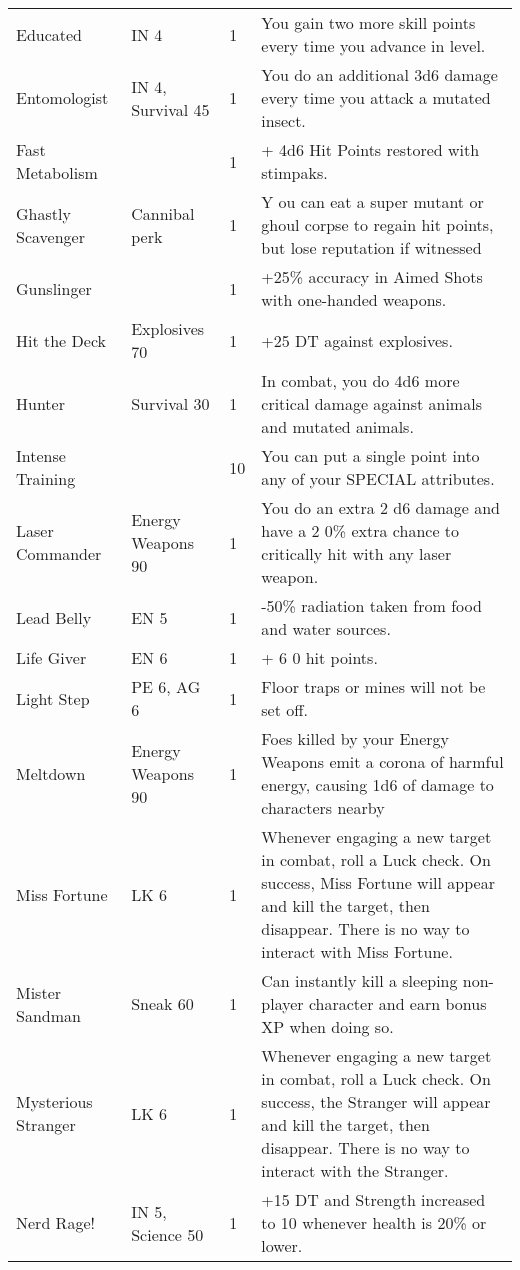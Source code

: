 \begin{longtable}{|p{3.3cm}|p{3.1cm}|p{1.2cm}|p{8.4cm}|}
Educated  & IN 4  & 1  & You gain two more skill points every time you advance in level.  \\
Entomologist  & IN 4, Survival 45  & 1  & You do an additional  3d6  damage every time you attack a mutated insect.  \\
Fast Metabolism  &  & 1  & + 4d6  Hit Points restored with stimpaks.  \\
Ghastly Scavenger  & Cannibal perk  & 1  & Y ou  can  eat a super mutant or ghoul corpse to regain hit points, but lose  reputation  if witnessed   \\
Gunslinger  &  & 1  & +25\% accuracy in  Aimed Shots  with one-handed weapons.  \\
Hit the Deck  & Explosives 70  & 1  & +25 DT against explosives.  \\
Hunter  & Survival 30  & 1  & In combat, you do  4d6  more critical damage against animals and mutated animals.  \\
Intense Training  &  & 10  & You can put a single point into any of your SPECIAL attributes.  \\
Laser Commander  & Energy Weapons 90  & 1  & You do an extra  2 d6  damage and have a  2 0\% extra chance to critically hit with any laser weapon.  \\
Lead Belly  & EN 5  & 1  & -50\% radiation taken from food and water sources.  \\
Life Giver  & EN 6  & 1  & + 6 0 hit points.  \\
Light Step  & PE 6, AG 6  & 1  & Floor traps or mines will not be set off.  \\
Meltdown  & Energy Weapons 90  & 1  & Foes killed by your Energy Weapons emit a corona of harmful energy,  causing 1d6 of damage to characters nearby   \\
Miss Fortune  & LK 6  & 1  & Whenever engaging a new target in combat, roll a Luck check. On success, Miss Fortune will appear and kill the target, then disappear. There is no way to interact with Miss Fortune. \\
Mister Sandman  & Sneak 60  & 1  & Can instantly kill a sleeping non-player character and earn bonus XP when doing so.  \\
Mysterious Stranger  & LK 6  & 1  & Whenever engaging a new target in combat, roll a Luck check. On success, the Stranger will appear and kill the target, then disappear. There is no way to interact with the Stranger. \\
Nerd Rage!  & IN 5, Science 50  & 1  & +15 DT and Strength increased to 10 whenever health is 20\% or lower.  \\

\end{longtable}
